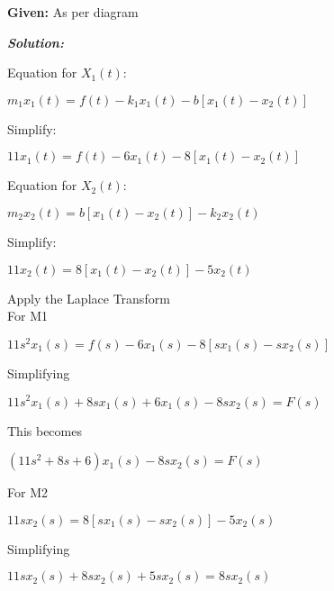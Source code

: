 \documentclass[11pt,letterpaper]{article}
\begin{document}
\noindent\textbf{Given:} As per diagram

\vspace{12pt}
\noindent\textit{\textbf{Solution:}}

\vspace{12pt}

Equation for $X_1(t)$:\\
\begin{center}
	$m_1x_1(t)=f(t)-k_1x_1(t)-b[x_1(t)-x_2(t)]$\\
\end{center}
Simplify:\\
\begin{center}
	$11x_1(t)=f(t)-6x_1(t)-8[x_1(t)-x_2(t)]$\\
\end{center}
Equation for $X_2(t)$:\\
\begin{center}
	$m_2x_2(t)=b[x_1(t)-x_2(t)]-k_2x_2(t)$\\
\end{center}
Simplify:\\
\begin{center}
	$11x_2(t)=8[x_1(t)-x_2(t)]-5x_2(t)$\\
\end{center}
Apply the Laplace Transform\\[12pt]
For M1\\
\begin{center}
	$11s^2x_1(s)=f(s)-6x_1(s)-8[sx_1(s)-sx_2(s)]$\\
\end{center}
Simplifying\\
\begin{center}
	$11s^2x_1(s)+8sx_1(s)+6x_1(s)-8sx_2(s)=F(s)$\\
\end{center}
This becomes\\
\begin{center}
	$(11s^2+8s+6)x_1(s)-8sx_2(s)=F(s)$\\
\end{center}
For M2\\
\begin{center}
	$11sx_2(s)=8[sx_1(s)-sx_2(s)]-5x_2(s)$\\
\end{center}
Simplifying\\
\begin{center}
	$11sx_2(s)+8sx_2(s)+5sx_2(s)=8sx_2(s)$\\
\end{center}
\end{document}
